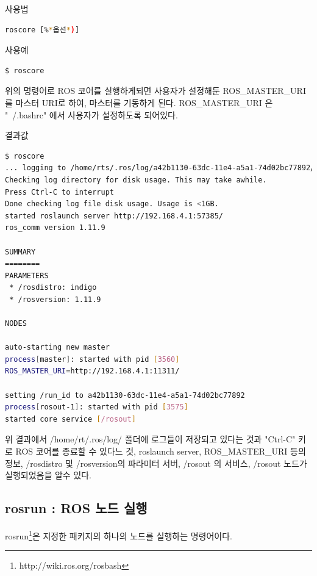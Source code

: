 \vspace{\baselineskip}
\noindent
{}\circled{\thenum} 사용법
\begin{lstlisting}[language=bash]
roscore [%*옵션*)]
\end{lstlisting}

\noindent
{}\circled{\thenum} 사용예
\begin{lstlisting}[language=bash]
$ roscore
\end{lstlisting}

\noindent
위의 명령어로 ROS 코어를 실행하게되면 사용자가 설정해둔 ROS\_MASTER\_URI 를 마스터 URI로 하여, 마스터를 기동하게 된다. ROS\_MASTER\_URI 은 "~/.bashrc" 에서 사용자가 설정하도록 되어있다.

\vspace{\baselineskip}
\noindent
{}\circled{\thenum} 결과값
\begin{lstlisting}[language=bash]
$ roscore
... logging to /home/rts/.ros/log/a42b1130-63dc-11e4-a5a1-74d02bc77892/roslaunch-rts-3547.log
Checking log directory for disk usage. This may take awhile.
Press Ctrl-C to interrupt
Done checking log file disk usage. Usage is <1GB.
started roslaunch server http://192.168.4.1:57385/
ros_comm version 1.11.9

SUMMARY
========
PARAMETERS
 * /rosdistro: indigo
 * /rosversion: 1.11.9

NODES

auto-starting new master
process[master]: started with pid [3560]
ROS_MASTER_URI=http://192.168.4.1:11311/

setting /run_id to a42b1130-63dc-11e4-a5a1-74d02bc77892
process[rosout-1]: started with pid [3575]
started core service [/rosout]
\end{lstlisting}

\vspace{\baselineskip}
\noindent
위 결과에서 /home/rt/.ros/log/ 폴더에 로그들이 저장되고 있다는 것과 "Ctrl-C" 키로 ROS 코어를 종료할 수 있다느 것, roslaunch server, ROS\_MASTER\_URI 등의 정보, /rosdistro 및 /rosversion의 파라미터 서버, /rosout 의 서비스, /rosout 노드가 실행되었음을 알수 있다.


\subsection{rosrun : ROS 노드 실행}

rosrun\footnote{http://wiki.ros.org/rosbash}은 지정한 패키지의 하나의 노드를 실행하는 명령어이다.

